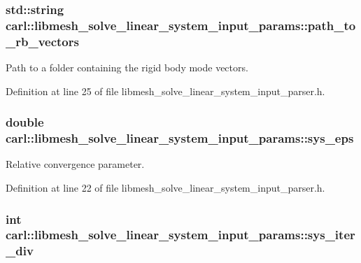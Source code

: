 \subsubsection[{path\+\_\+to\+\_\+rb\+\_\+vectors}]{\setlength{\rightskip}{0pt plus 5cm}std\+::string carl\+::libmesh\+\_\+solve\+\_\+linear\+\_\+system\+\_\+input\+\_\+params\+::path\+\_\+to\+\_\+rb\+\_\+vectors}\label{structcarl_1_1libmesh__solve__linear__system__input__params_ab1c0d1c19d1849c0b32e0a1d95d11bff}


Path to a folder containing the rigid body mode vectors. 



Definition at line 25 of file libmesh\+\_\+solve\+\_\+linear\+\_\+system\+\_\+input\+\_\+parser.\+h.

\hypertarget{structcarl_1_1libmesh__solve__linear__system__input__params_aac011ff9dbbc01b0177480e9cdadb5b8}{}
\subsubsection[{sys\+\_\+eps}]{\setlength{\rightskip}{0pt plus 5cm}double carl\+::libmesh\+\_\+solve\+\_\+linear\+\_\+system\+\_\+input\+\_\+params\+::sys\+\_\+eps}\label{structcarl_1_1libmesh__solve__linear__system__input__params_aac011ff9dbbc01b0177480e9cdadb5b8}


Relative convergence parameter. 



Definition at line 22 of file libmesh\+\_\+solve\+\_\+linear\+\_\+system\+\_\+input\+\_\+parser.\+h.

\hypertarget{structcarl_1_1libmesh__solve__linear__system__input__params_afead959622d671c5b5ee1200c2e43dad}{}
\subsubsection[{sys\+\_\+iter\+\_\+div}]{\setlength{\rightskip}{0pt plus 5cm}int carl\+::libmesh\+\_\+solve\+\_\+linear\+\_\+system\+\_\+input\+\_\+params\+::sys\+\_\+iter\+\_\+div}\label{structcarl_1_1libmesh__solve__linear__system__input__params_afead959622d671c5b5ee1200c2e43dad}


